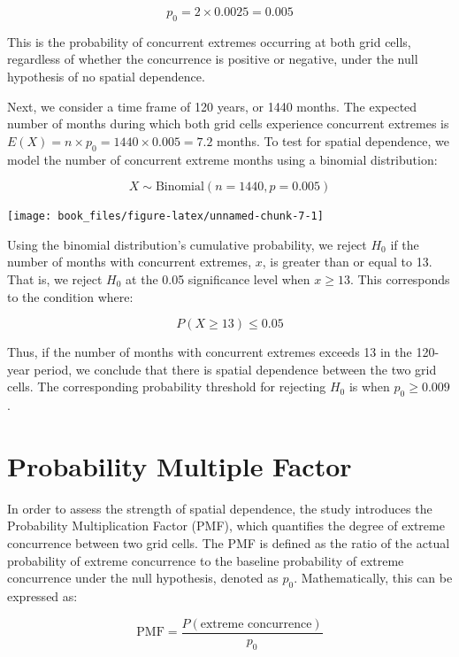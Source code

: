 \documentclass[
]{krantz}
\begin{document}
\[
p_0 = 2 \times 0.0025 = 0.005
\]

This is the probability of concurrent extremes occurring at both grid cells, regardless of whether the concurrence is positive or negative, under the null hypothesis of no spatial dependence.

Next, we consider a time frame of 120 years, or 1440 months. The expected number of months during which both grid cells experience concurrent extremes is \(E(X) = n \times p_0 = 1440 \times 0.005 = 7.2\) months. To test for spatial dependence, we model the number of concurrent extreme months using a binomial distribution:

\[
X \sim \text{Binomial}(n = 1440, p = 0.005)
\]
\vspace{1em}

\begin{center}\texttt{[image: book\_files/figure-latex/unnamed-chunk-7-1]} \end{center}
\vspace{1em}

Using the binomial distribution's cumulative probability, we reject \(H_0\) if the number of months with concurrent extremes, \(x\), is greater than or equal to 13. That is, we reject \(H_0\) at the 0.05 significance level when \(x \geq 13\). This corresponds to the condition where:

\[
P(X \geq 13) \leq 0.05
\]

Thus, if the number of months with concurrent extremes exceeds 13 in the 120-year period, we conclude that there is spatial dependence between the two grid cells. The corresponding probability threshold for rejecting \(H_0\) is when \(p_0 \geq 0.009\).

\section{Probability Multiple Factor}\label{probability-multiple-factor}

In order to assess the strength of spatial dependence, the study introduces the Probability Multiplication Factor (PMF), which quantifies the degree of extreme concurrence between two grid cells. The PMF is defined as the ratio of the actual probability of extreme concurrence to the baseline probability of extreme concurrence under the null hypothesis, denoted as \(p_0\). Mathematically, this can be expressed as:

\[
\text{PMF} = \frac{P(\text{extreme concurrence})}{p_0}
\]
\end{document}

